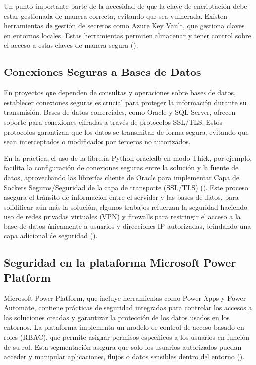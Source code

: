 \documentclass[letter,oneside,12pt,spanish]{report}
\begin{document}
\noindent Un punto importante parte de la necesidad de que la clave de encriptación debe estar gestionada de manera correcta, evitando que sea vulnerada. Existen herramientas de gestión de secretos como Azure Key Vault, que gestiona claves en entornos locales. Estas herramientas permiten almacenar y tener control sobre el acceso a estas claves de manera segura (\cite{microsoft2024keyvault}).

\subsection{Conexiones Seguras a Bases de Datos}

\noindent En proyectos que dependen de consultas y operaciones sobre bases de datos, establecer conexiones seguras es crucial para proteger la información durante su transmisión. Bases de datos comerciales, como Oracle y SQL Server, ofrecen soporte para conexiones cifradas a través de protocolos SSL/TLS. Estos protocolos garantizan que los datos se transmitan de forma segura, evitando que sean interceptados o modificados por terceros no autorizados.

\noindent En la práctica, el uso de la librería Python-oracledb en modo Thick, por ejemplo, facilita la configuración de conexiones seguras entre la solución y la fuente de datos, aprovechando las librerías cliente de Oracle para implementar Capa de Sockets Seguros/Seguridad de la capa de transporte (SSL/TLS) (\cite{oracle2024python}). Este proceso asegura el tránsito de información entre el servidor y las bases de datos, para solidificar aún más la solución, algunos trabajos refuerzan la seguridad haciendo uso de redes privadas virtuales (VPN) y firewalls para restringir el acceso a la base de datos únicamente a usuarios y direcciones IP autorizadas, brindando una capa adicional de seguridad (\cite{microsoft2024vpn}).

\subsection{Seguridad en la plataforma Microsoft Power Platform}

\noindent Microsoft Power Platform, que incluye herramientas como Power Apps y Power Automate, contiene prácticas de seguridad integradas para controlar los accesos a las soluciones creadas y garantizar la protección de los datos usados en los entornos. La plataforma implementa un modelo de control de acceso basado en roles (RBAC), que permite asignar permisos específicos a los usuarios en función de su rol. Esta segmentación asegura que solo los usuarios autorizados puedan acceder y manipular aplicaciones, flujos o datos sensibles dentro del entorno (\cite{microsoft2024securityroles}).
\end{document}

